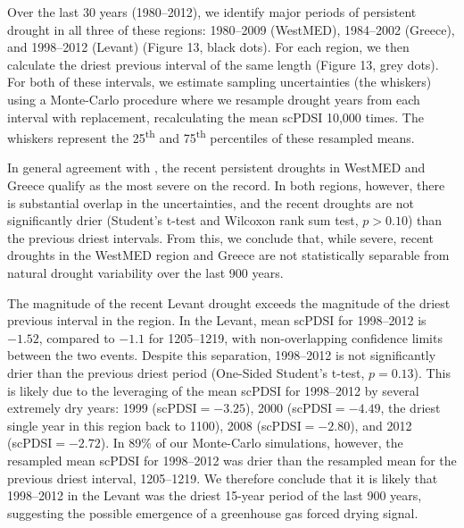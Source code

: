 \documentclass[draft,jgr]{AGUTeX}
\begin{document}
\begin{article}
\indent Over the last 30 years (1980--2012), we identify major periods of persistent drought in all three of these regions: 1980--2009 (WestMED), 1984--2002 (Greece), and 1998--2012 (Levant) (Figure 13, black dots). For each region, we then calculate the driest previous interval of the same length (Figure 13, grey dots). For both of these intervals, we estimate sampling uncertainties (the whiskers) using a Monte-Carlo procedure where we resample drought years from each interval with replacement, recalculating the mean scPDSI 10,000 times. The whiskers represent the 25\textsuperscript{th} and 75\textsuperscript{th} percentiles of these resampled means.

\indent In general agreement with \citet{Touchan:etal2008a}, the recent persistent droughts in WestMED and Greece qualify as the most severe on the record. In both regions, however, there is substantial overlap in the uncertainties, and the recent droughts are not significantly drier (Student's t-test and Wilcoxon rank sum test, $p>0.10$) than the previous driest intervals. From this, we conclude that, while severe, recent droughts in the WestMED region and Greece are not statistically separable from natural drought variability over the last 900 years.

\indent The magnitude of the recent Levant drought exceeds the magnitude of the driest previous interval in the region. In the Levant, mean scPDSI for 1998--2012 is $-1.52$, compared to $-1.1$ for 1205--1219, with non-overlapping confidence limits between the two events. Despite this separation, 1998--2012 is not significantly drier than the previous driest period (One-Sided Student's t-test, $p=0.13$). This is likely due to the leveraging of the mean scPDSI for 1998--2012 by several extremely dry years: 1999 (scPDSI$=-3.25$), 2000 (scPDSI$=-4.49$, the driest single year in this region back to 1100), 2008 (scPDSI$=-2.80$), and 2012 (scPDSI$=-2.72$). In 89\% of our Monte-Carlo simulations, however, the resampled mean scPDSI for 1998--2012 was drier than the resampled mean for the previous driest interval, 1205--1219. We therefore conclude that it is likely that 1998--2012 in the Levant was the driest 15-year period of the last 900 years, suggesting the possible emergence of a greenhouse gas forced drying signal.


\end{article}
\end{document}
